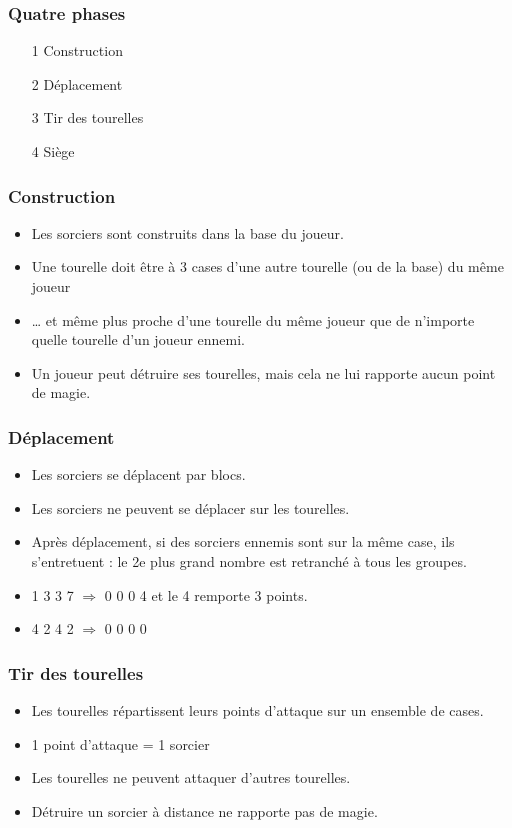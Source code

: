 \documentclass{beamer}
\begin{document}
\begin{frame}
	\frametitle{Quatre phases}
	\begin{itemize}
	\item[1] Construction
	\item[2] Déplacement
	\item[3] Tir des tourelles
	\item[4] Siège
	\end{itemize}
\end{frame}

\begin{frame}
	\frametitle{Construction}
	\begin{itemize}
	\item Les sorciers sont construits dans la base du joueur.
	\item Une tourelle doit être à 3 cases d'une autre tourelle (ou de la base) du même joueur
	\item … et même plus proche d'une tourelle du même joueur que de n'importe quelle tourelle d'un joueur ennemi.
	\item Un joueur peut détruire ses tourelles, mais cela ne lui rapporte aucun point de magie.
	\end{itemize}
\end{frame}

\begin{frame}
	\frametitle{Déplacement}
	\begin{itemize}
	\item Les sorciers se déplacent par blocs.
	\item Les sorciers ne peuvent se déplacer sur les tourelles.
	\item Après déplacement, si des sorciers ennemis sont sur la même case, ils s'entretuent : le 2e plus grand nombre est retranché à tous les groupes.
	\end{itemize}
	\begin{example}[Exemple]
	\begin{itemize}
	\item 1 3 3 7 $\Rightarrow$ 0 0 0 4 et le 4\ieme{} remporte $3$ points.
	\item 4 2 4 2 $\Rightarrow$ 0 0 0 0
	\end{itemize}
	\end{example}
\end{frame}

\begin{frame}
	\frametitle{Tir des tourelles}
	\begin{itemize}
	\item Les tourelles répartissent leurs points d'attaque sur un ensemble de cases.
	\item 1 point d'attaque = 1 sorcier
	\item Les tourelles ne peuvent attaquer d'autres tourelles.
	\item Détruire un sorcier à distance ne rapporte pas de magie.
	\end{itemize}
\end{frame}
\end{document}

